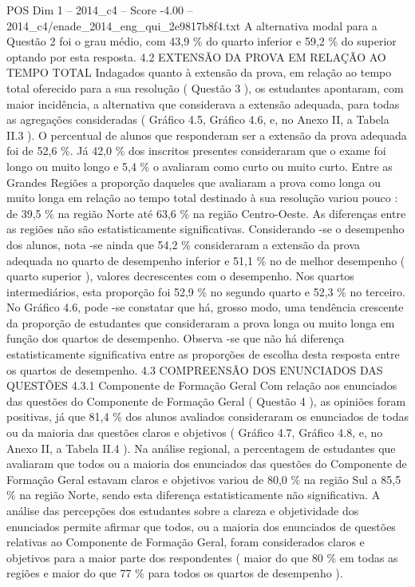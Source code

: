 \begin{textsample}{POS Dim 1 – 2014\_c4 – Score -4.00 – 2014\_c4/enade\_2014\_eng\_qui\_2e9817b8f4.txt}
A alternativa modal para a Questão 2 foi o grau médio, com 43,9 \% do quarto inferior e 59,2 \% do superior optando por esta resposta. 4.2 EXTENSÃO DA PROVA EM RELAÇÃO AO TEMPO TOTAL Indagados quanto à extensão da prova, em relação ao tempo total oferecido para a sua resolução ( Questão 3 ), os estudantes apontaram, com maior incidência, a alternativa que considerava a extensão adequada, para todas as agregações consideradas ( Gráfico 4.5, Gráfico 4.6, e, no Anexo II, a Tabela II.3 ).
O percentual de alunos que responderam ser a extensão da prova adequada foi de 52,6 \%.
Já 42,0 \% dos inscritos presentes consideraram que o exame foi longo ou muito longo e 5,4 \% o avaliaram como curto ou muito curto.
Entre as Grandes Regiões a proporção daqueles que avaliaram a prova como longa ou muito longa em relação ao tempo total destinado à sua resolução variou pouco : de 39,5 \% na região Norte até 63,6 \% na região Centro-Oeste.
As diferenças entre as regiões não são estatisticamente significativas.
Considerando -se o desempenho dos alunos, nota -se ainda que 54,2 \% consideraram a extensão da prova adequada no quarto de desempenho inferior e 51,1 \% no de melhor desempenho ( quarto superior ), valores decrescentes com o desempenho.
Nos quartos intermediários, esta proporção foi 52,9 \% no segundo quarto e 52,3 \% no terceiro.
No Gráfico 4.6, pode -se constatar que há, grosso modo, uma tendência crescente da proporção de estudantes que consideraram a prova longa ou muito longa em função dos quartos de desempenho.
Observa -se que não há diferença estatisticamente significativa entre as proporções de escolha desta resposta entre os quartos de desempenho. 4.3 COMPREENSÃO DOS ENUNCIADOS DAS QUESTÕES 4.3.1 Componente de Formação Geral Com relação aos enunciados das questões do Componente de Formação Geral ( Questão 4 ), as opiniões foram positivas, já que 81,4 \% dos alunos avaliados consideraram os enunciados de todas ou da maioria das questões claros e objetivos ( Gráfico 4.7, Gráfico 4.8, e, no Anexo II, a Tabela II.4 ).
Na análise regional, a percentagem de estudantes que avaliaram que todos ou a maioria dos enunciados das questões do Componente de Formação Geral estavam claros e objetivos variou de 80,0 \% na região Sul a 85,5 \% na região Norte, sendo esta diferença estatisticamente não significativa.
A análise das percepções dos estudantes sobre a clareza e objetividade dos enunciados permite afirmar que todos, ou a maioria dos enunciados de questões relativas ao Componente de Formação Geral, foram considerados claros e objetivos para a maior parte dos respondentes ( maior do que 80 \% em todas as regiões e maior do que 77 \% para todos os quartos de desempenho ).

\end{textsample}
